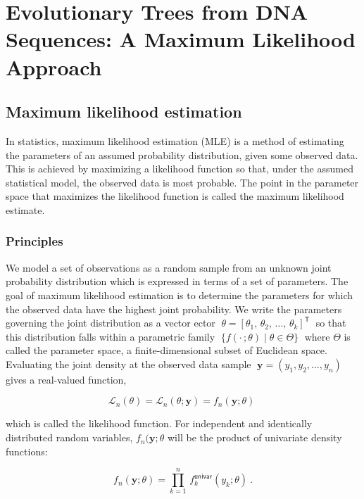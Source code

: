 \graphicspath{{chapters/13/images}}
\chapter{Evolutionary Trees from DNA Sequences: A Maximum Likelihood Approach}
\section{Maximum likelihood estimation}
In statistics, maximum likelihood estimation (MLE) is a method of estimating the parameters of an assumed probability distribution, given some observed data. This is achieved by maximizing a likelihood function so that, under the assumed statistical model, the observed data is most probable. The point in the parameter space that maximizes the likelihood function is called the maximum likelihood estimate.
\subsection{Principles}
We model a set of observations as a random sample from an unknown joint probability distribution which is expressed in terms of a set of parameters. The goal of maximum likelihood estimation is to determine the parameters for which the observed data have the highest joint probability. We write the parameters governing the joint distribution as a vector ector
$\;\theta =\left[\theta _{1},\,\theta _{2},\,\ldots ,\,\theta _{k}\right]^{\mathsf {T}}\;$
so that this distribution falls within a parametric family
$\;\{f(\cdot \,;\theta )\mid \theta \in \Theta \}\;$ where $\Theta$ is called the parameter space, a finite-dimensional subset of Euclidean space.
Evaluating the joint density at the observed data sample
$ \;\mathbf {y} =(y_{1},y_{2},\ldots ,y_{n})\;$
gives a real-valued function,

\begin{equation}
{\mathcal {L}}_{n}(\theta )={\mathcal {L}}_{n}(\theta ;\mathbf {y} )=f_{n}(\mathbf {y} ;\theta )\;
\end{equation}

which is called the likelihood function. For independent and identically distributed random variables, $ f_{n}(\mathbf {y} ;\theta $
will be the product of univariate density functions:

\begin{equation}
{\displaystyle f_{n}(\mathbf {y} ;\theta )=\prod _{k=1}^{n}\,f_{k}^{\mathsf {univar}}(y_{k};\theta )~.}
\end{equation}

